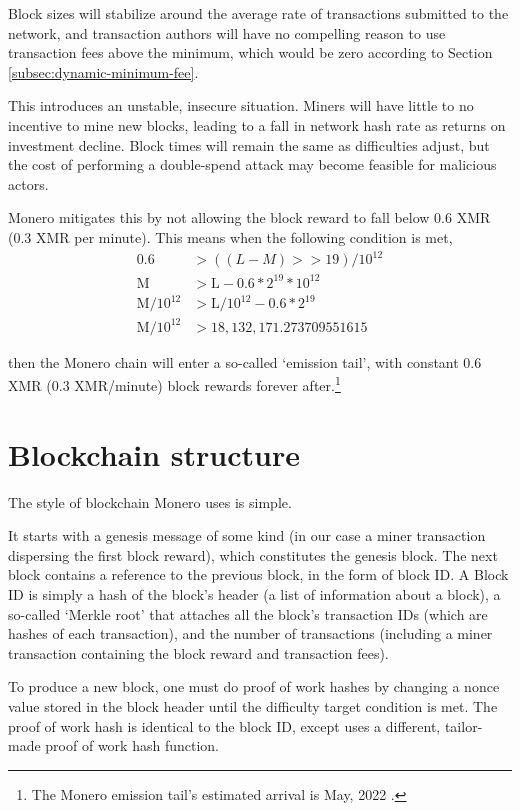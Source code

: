 Block sizes will stabilize around the average rate of transactions submitted to the network, and transaction authors will have no compelling reason to use transaction fees above the minimum, which would be zero according to Section \ref{subsec:dynamic-minimum-fee}. 

This introduces an unstable, insecure situation. Miners will have little to no incentive to mine new blocks, leading to a fall in network hash rate as returns on investment decline. Block times will remain the same as difficulties adjust, but the cost of performing a double-spend attack may become feasible for malicious actors.
        
Monero mitigates this by not allowing the block reward to fall below 0.6 XMR (0.3 XMR per minute). This means when the following condition is met,
\begin{align*}
               0.6 &> ((L-M) >> 19)/10^{12} \\
        \textrm{M} &> \textrm{L} - 0.6*2^{19}*10^{12} \\
\textrm{M}/10^{12} &> \textrm{L}/10^{12} - 0.6*2^{19} \\
\textrm{M}/10^{12} &> 18,132,171.273709551615
\end{align*}

then the Monero chain will enter a so-called `emission tail', with constant 0.6 XMR (0.3 XMR/minute) block rewards forever after.\footnote{The Monero emission tail's estimated arrival is May, 2022 \cite{monero-tail-emission}.}



\section{Blockchain structure}
\label{sec:blockchain-structure}

The style of blockchain Monero uses is simple. 

It starts with a genesis message of some kind (in our case a miner transaction dispersing the first block reward), which constitutes the genesis block. The next block contains a reference to the previous block, in the form of block ID. A Block ID is simply a hash of the block's header (a list of information about a block), a so-called `Merkle root' that attaches all the block's transaction IDs (which are hashes of each transaction), and the number of transactions (including a miner transaction containing the block reward and transaction fees). 

To produce a new block, one must do proof of work hashes by changing a nonce value stored in the block header until the difficulty target condition is met. The proof of work hash is identical to the block ID, except uses a different, tailor-made proof of work hash function.

